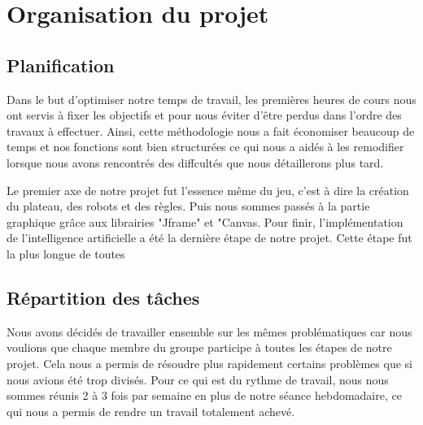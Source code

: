 \documentclass{rapportECL}
\begin{document}
\newpage

\section{Organisation du projet}
\subsection{Planification}

Dans le but d'optimiser notre temps de travail, les premières heures de cours nous ont servis à fixer les objectifs et pour nous éviter d'être perdus dans l'ordre des travaux à effectuer. Ainsi, cette méthodologie nous a fait économiser beaucoup de temps et nos fonctions sont bien structurées ce qui nous a aidés à les remodifier lorsque nous avons rencontrés des diffcultés que nous détaillerons plus tard.

Le premier axe de notre projet fut l'essence même du jeu, c'est à dire la création du plateau, des robots et des règles.
Puis nous sommes passés à la partie graphique grâce aux librairies "Jframe" et "Canvas.
Pour finir, l'implémentation de l'intelligence artificielle a été la dernière étape de notre projet. Cette étape fut la plus longue de toutes 

\subsection{Répartition des tâches}

Nous avons décidés de travailler ensemble sur les mêmes problématiques car nous voulions que chaque membre du groupe participe à toutes les étapes de notre projet. Cela nous a permis de résoudre plus rapidement certains problèmes que si nous avions été trop divisés. 
Pour ce qui est du rythme de travail, nous nous sommes réunis 2 à 3 fois par semaine en plus de notre séance hebdomadaire, ce qui nous a permis de rendre un travail totalement achevé.

\newpage
\end{document}
